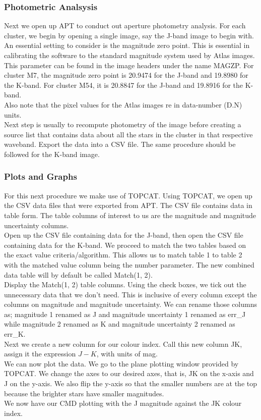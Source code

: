 \documentclass[12pt]{article}
\begin{document}
		\subsubsection{Photometric Analsysis}
		Next we open up APT to conduct out aperture photometry analysis. For each cluster, we begin by opening a single image, say the J-band image to begin with. An essential setting to consider is the magnitude zero point. This is essential in calibrating the software to the standard magnitude system used by Atlas images. This parameter can be found in the image headers under the name MAGZP. For cluster M7, the magnitude zero point is 20.9474 for the J-band and 19.8980 for the K-band. For cluster M54, it is 20.8847 for the J-band and 19.8916 for the K-band.\\
		Also note that the pixel values for the Atlas images re in data-number (D.N) units.\\
		Next step is usually to recompute photometry of the image before creating a source list that contains data about all the stars in the cluster in that respective waveband. Export the data into a CSV file. The same procedure should be followed for the K-band image.
		\subsubsection{Plots and Graphs}
		For this next procedure we make use of TOPCAT. Using TOPCAT, we open up the CSV data files that were exported from APT. The CSV file contains data in table form. The table columns of interest to us are the magnitude and magnitude uncertainty columns.\\
		Open up the CSV file containing data for the J-band, then open the CSV file containing data for the K-band. We proceed to match the two tables based on the exact value criteria/algorithm. This allows us to match table 1 to table 2 with the matched value column being the number parameter. The new combined data table will by default be called Match(1, 2).\\
		Display the Match(1, 2) table columns. Using the check boxes, we tick out the unnecessary data that we don't need. This is inclusive of every column except the columns on magnitude and magnitude uncertainty. We can rename those columns as; magnitude 1 renamed as J and magnitude uncertainty 1 renamed as err\_J while magnitude 2 renamed as K and magnitude uncertainty 2 renamed as err\_K.\\
		Next we create a new column for our colour index. Call this new column JK, assign it the expression $J - K$, with units of mag.\\
		We can now plot the data. We go to the plane plotting window provided by TOPCAT. We change the axes to our desired axes, that is, JK on the x-axis and J on the y-axis. We also flip the y-axis so that the smaller numbers are at the top because the brighter stars have smaller magnitudes.\\
		We now have our CMD plotting with the J magnitude against the JK colour index.
		
\end{document}
